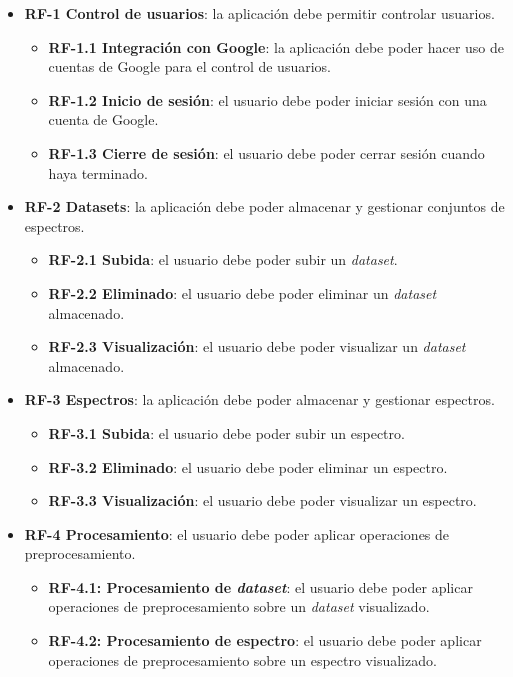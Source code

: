 \begin{itemize}
	\item \textbf{RF-1 Control de usuarios}: la aplicación debe permitir 
	controlar usuarios.
	\begin{itemize}
		\item \textbf{RF-1.1 Integración con Google}: la aplicación debe poder 
		hacer uso de cuentas de Google para el control de usuarios.
		\item \textbf{RF-1.2 Inicio de sesión}: el usuario debe poder iniciar 
		sesión con una	cuenta de Google.
		\item \textbf{RF-1.3 Cierre de sesión}: el usuario debe poder cerrar 
		sesión cuando haya terminado.
	\end{itemize}
	\item \textbf{RF-2 Datasets}: la aplicación debe poder almacenar y 
	gestionar conjuntos de espectros.
	\begin{itemize}
		\item \textbf{RF-2.1 Subida}: el usuario debe poder subir un 
		\textit{dataset}.
		\item \textbf{RF-2.2 Eliminado}: el usuario debe poder eliminar un 
		\textit{dataset} almacenado.
		\item \textbf{RF-2.3 Visualización}: el usuario debe poder visualizar 
		un \textit{dataset} almacenado.
	\end{itemize}
	\item \textbf{RF-3 Espectros}: la aplicación debe poder almacenar y 
	gestionar espectros.
	\begin{itemize}
		\item \textbf{RF-3.1 Subida}: el usuario debe poder subir un espectro.
		\item \textbf{RF-3.2 Eliminado}: el usuario debe poder eliminar un 
		espectro.
		\item \textbf{RF-3.3 Visualización}: el usuario debe poder visualizar 
		un espectro.
	\end{itemize}
	\item \textbf{RF-4 Procesamiento}: el usuario debe poder aplicar 
	operaciones de preprocesamiento.
	\begin{itemize}
		\item \textbf{RF-4.1: Procesamiento de \textit{dataset}}: el usuario 
		debe poder aplicar operaciones de preprocesamiento sobre un 
		\textit{dataset} visualizado.
		\item \textbf{RF-4.2: Procesamiento de espectro}: el usuario debe poder 
		aplicar operaciones de preprocesamiento sobre un espectro visualizado.

\end{itemize}
\end{itemize}
